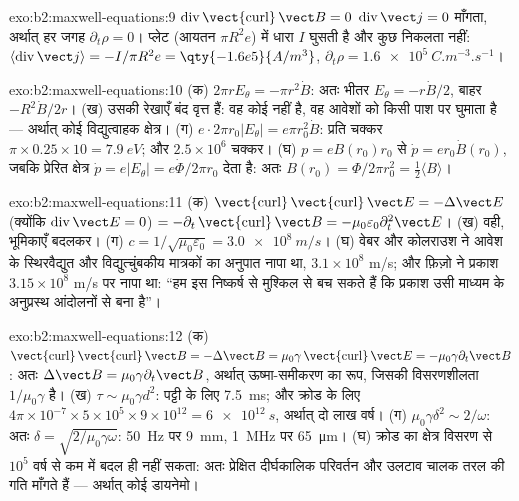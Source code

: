 \begin{solution}{exo:b2:maxwell-equations:9}
$\operatorname{div}\operatorname{\vect{curl}}\vect B = 0$ $\operatorname{div}\vect j =
0$ माँगता, अर्थात् हर जगह $\partial_t\rho = 0$। प्लेट (आयतन $\pi R^2e$) में
धारा $I$ घुसती है और कुछ निकलता नहीं: $\langle\operatorname{div}\vect j\rangle =
-I/\pi R^2e = \qty{-1.6e5}{A/m^3}$, $\partial_t\rho = \qty{+1.6e5}{C.m^{-3}.s^{-1}}$।
\end{solution}

\begin{solution}{exo:b2:maxwell-equations:10}
(क) $2\pi rE_\theta = -\pi r^2\dot B$: अतः भीतर $E_\theta = -r\dot B/2$, बाहर $-R^2\dot B/2r$।
(ख) उसकी रेखाएँ बंद वृत्त हैं: वह कोई  नहीं है, वह आवेशों को
किसी पाश पर घुमाता है --- अर्थात् कोई विद्युत्वाहक क्षेत्र। (ग) $e\cdot2\pi r_0
|E_\theta| = e\pi r_0^2\dot B$: प्रति चक्कर $\pi \times 0.25 \times 10 = \qty{7.9}{eV}$; और $2.5 \times 10^6$
चक्कर। (घ) $p = eB(r_0)r_0$ से $\dot p = er_0\dot B(r_0)$, जबकि प्रेरित
क्षेत्र $\dot p = e|E_\theta| = e\dot\Phi/2\pi r_0$ देता है: अतः $B(r_0) = \Phi/2\pi r_0^2 =
\tfrac12\langle B\rangle$।
\end{solution}

\begin{solution}{exo:b2:maxwell-equations:11}
(क) $\operatorname{\vect{curl}}\operatorname{\vect{curl}}\vect E = -\Delta\vect E$ (क्योंकि $\operatorname{div}
\vect E = 0$) $= -\partial_t\operatorname{\vect{curl}}\vect B = -\mu_0\varepsilon_0\partial_t^2\vect E$। (ख)
वही, भूमिकाएँ बदलकर। (ग) $c = 1/\sqrt{\mu_0\varepsilon_0} = \qty{3.0e8}{m/s}$।
(घ) वेबर और कोलराउश ने आवेश के स्थिरवैद्युत और
विद्युत्चुंबकीय मात्रकों का अनुपात नापा था, $3.1 \times 10^8$ m/s; और फ़िज़ो ने
प्रकाश $3.15 \times 10^8$ m/s पर नापा था: ``हम इस निष्कर्ष से मुश्किल से बच
सकते हैं कि प्रकाश उसी माध्यम के अनुप्रस्थ आंदोलनों से बना है''।
\end{solution}

\begin{solution}{exo:b2:maxwell-equations:12}
(क) $\operatorname{\vect{curl}}\operatorname{\vect{curl}}\vect B = -\Delta\vect B = \mu_0\gamma\operatorname{\vect{curl}}
\vect E = -\mu_0\gamma\partial_t\vect B$: अतः $\Delta\vect B = \mu_0\gamma\partial_t\vect B$, अर्थात् ऊष्मा-समीकरण
का रूप, जिसकी विसरणशीलता $1/\mu_0\gamma$ है। (ख) $\tau \sim \mu_0\gamma d^2$: पट्टी के लिए \qty{7.5}{ms};
और क्रोड के लिए $4\pi \times 10^{-7} \times 5 \times 10^5 \times 9 \times 10^{12} = \qty{6e12}{s}$, अर्थात् दो लाख
वर्ष। (ग) $\mu_0\gamma\delta^2 \sim 2/\omega$: अतः $\delta = \sqrt{2/\mu_0
\gamma\omega}$: \qty{50}{Hz} पर \qty{9}{mm}, \qty{1}{MHz} पर \qty{65}{\micro m}। (घ) क्रोड का
क्षेत्र विसरण से $10^5$ वर्ष से कम में बदल ही नहीं सकता: अतः
प्रेक्षित दीर्घकालिक परिवर्तन और उलटाव चालक तरल की गति माँगते हैं
--- अर्थात् कोई डायनेमो।
\end{solution}

